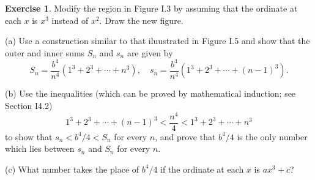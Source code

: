\documentclass[11pt,a4paper]{book}
\theoremstyle{definition}
\newtheorem{exercise}{Exercise}
\begin{document}

\begin{exercise}\label{ex:2}
  Modify the region in Figure I.3 by assuming that the ordinate at each $x$ is $x^3$ instead of $x^2$.
  Draw the new figure.

  (a) Use a construction similar to that iluustrated in Figure I.5 and show that the outer and inner
  sums $S_n$ and $s_n$ are given by
  \[
  S_n = \frac{b^4}{n^4} \left( 1^3 + 2^3 + \cdots + n^3 \right), \quad s_n = \frac{b^4}{n^4} \left( 1^3 + 2^3 + \cdots + (n-1)^3 \right).
  \]

  (b) Use the inequalities (which can be proved by mathematical induction; see Section I4.2)
  \[
  \tag{I.12} 1^3 + 2^3 + \cdots + (n - 1)^3 < \frac{n^4}{4} < 1^3 + 2^3 + \cdots + n^3
  \]
  to show that $s_n < b^4 /4 < S_n$ for every $n$, and prove that $b^4/4$ is the only number which lies between $s_n$ and $S_n$ for every $n$.

  (c) What number takes the place of $b^4/4$ if the ordinate at each $x$ is $ax^3+c$?
\end{exercise}
\end{document}
